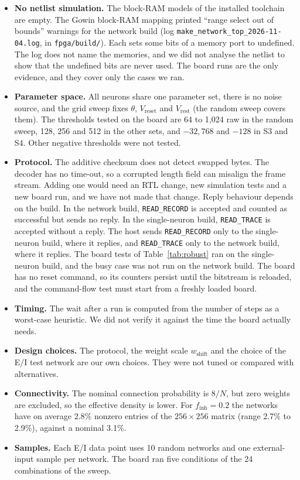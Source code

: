 \documentclass[11pt]{article}
\begin{document}
\begin{itemize}
\item \textbf{No netlist simulation.} The block-RAM models of the installed toolchain are empty. The Gowin block-RAM mapping printed ``range select out of bounds'' warnings for the network build (log \texttt{make\_network\_top\_2026-11-04.log}, in \texttt{fpga/build/}). Each sets some bits of a memory port to undefined. The log does not name the memories, and we did not analyse the netlist to show that the undefined bits are never used. The board runs are the only evidence, and they cover only the cases we ran.
\item \textbf{Parameter space.} All neurons share one parameter set, there is no noise source, and the grid sweep fixes $\theta$, $V_{\mathrm{reset}}$ and $V_{\mathrm{rest}}$ (the random sweep covers them). The thresholds tested on the board are 64 to 1,024 raw in the random sweep, 128, 256 and 512 in the other sets, and $-32{,}768$ and $-128$ in S3 and S4. Other negative thresholds were not tested.
\item \textbf{Protocol.} The additive checksum does not detect swapped bytes. The decoder has no time-out, so a corrupted length field can misalign the frame stream. Adding one would need an RTL change, new simulation tests and a new board run, and we have not made that change. Reply behaviour depends on the build. In the network build, \texttt{READ\_RECORD} is accepted and counted as successful but sends no reply. In the single-neuron build, \texttt{READ\_TRACE} is accepted without a reply. The host sends \texttt{READ\_RECORD} only to the single-neuron build, where it replies, and \texttt{READ\_TRACE} only to the network build, where it replies. The board tests of Table~\ref{tab:robust} ran on the single-neuron build, and the busy case was not run on the network build. The board has no reset command, so its counters persist until the bitstream is reloaded, and the command-flow test must start from a freshly loaded board.
\item \textbf{Timing.} The wait after a run is computed from the number of steps as a worst-case heuristic. We did not verify it against the time the board actually needs.
\item \textbf{Design choices.} The protocol, the weight scale $w_{\mathrm{shift}}$ and the choice of the E/I test network are our own choices. They were not tuned or compared with alternatives.
\item \textbf{Connectivity.} The nominal connection probability is $8/N$, but zero weights are excluded, so the effective density is lower. For $f_{\mathrm{inh}}=0.2$ the networks have on average 2.8\% nonzero entries of the $256 \times 256$ matrix (range 2.7\% to 2.9\%), against a nominal 3.1\%.
\item \textbf{Samples.} Each E/I data point uses 10 random networks and one external-input sample per network. The board ran five conditions of the 24 combinations of the sweep.
\end{itemize}
\end{document}
